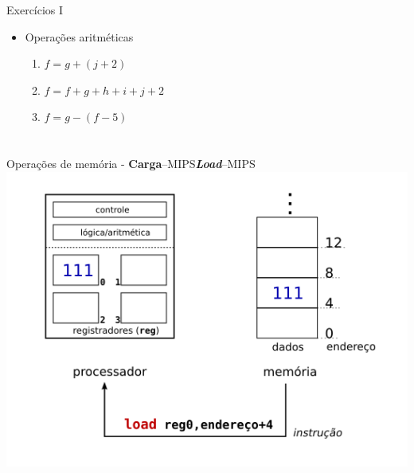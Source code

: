 \begin{frame}{Exercícios I}
  \begin{itemize}

  \item Operações aritméticas
    \begin{enumerate}
    \item $f = g + (j + 2)$
    \item $f=f+g+h+i+j+2$
    \item $f=g- (f - 5)$
    \end{enumerate}
    \bigskip
  \end{itemize}
  
\end{frame}



\lecturetitle{\insertlecture}{\course}

\frame{\maketitle}

\section{\insertlecture}

\begin{frame}{Operações de memória - {\bf Carga}--MIPS}{{\em\bf Load}--MIPS}
\includegraphics[scale=0.7]{instr_mem_load.png}
\end{frame}

